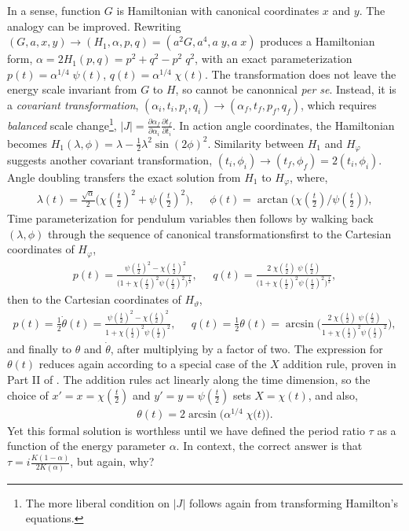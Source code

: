 \documentclass[nofootinbib,preprint]{revtex4-1}
\begin{document}
In a sense, function $G$ is Hamiltonian with canonical coordinates $x$ and $y$. The analogy can be 
improved. Rewriting $(G,a,x,y) \rightarrow (H_1,\alpha,p,q)=(a^2 G,a^4,a\;y,a\;x)$
produces a Hamiltonian form, $\alpha=2H_1(p,q)=p^2+q^2 - p^2 \; q^2$, with an exact parameterization 
${p(t)=\alpha^{1/4} \;\psi(t)}$, ${q(t)=\alpha^{1/4} \;\chi(t)}$. The transformation does not leave 
the energy scale invariant from $G$ to $H$, so cannot be canonnical \textit{per se}. Instead, it is a 
\textit{covariant transformation}, $(\alpha_i,t_i,p_i,q_i) \rightarrow (\alpha_f,t_f,p_f,q_f)$, 
which requires \textit{balanced} scale change\footnote{The more liberal 
condition on $|J|$ follows again from transforming Hamilton's equations. }, 
$|J| = \frac{\partial\alpha_f}{\partial \alpha_i}\frac{\partial t_f}{\partial t_i}$. In action angle 
coordinates, the Hamiltonian becomes $H_1(\lambda,\phi) = \lambda-\frac{1}{2}\lambda^2\sin(2\phi)^2$.
Similarity between $H_{1}$ and $H_{\varphi}$ suggests another covariant transformation, 
$(t_i,\phi_i)\rightarrow (t_f,\phi_f)=2(t_i,\phi_i)$.  Angle doubling transfers the exact 
solution from $H_{1}$ to $H_{\varphi}$, where, 
\begin{eqnarray}
\lambda(t) = \frac{\sqrt{\alpha}}{2}\Big(\chi(\tfrac{t}{2})^2 + \psi(\tfrac{t}{2})^2\Big), \;\;\;\;\; 
\phi(t)   =  \arctan\big(\chi(\tfrac{t}{2})/\psi(\tfrac{t}{2})\big),  \nonumber 
\end{eqnarray}
Time parameterization for pendulum variables then follows by walking back $(\lambda,\phi)$ through 
the sequence of canonical transformations\textemdash first to the Cartesian coordinates of $H_{\varphi}$,
\begin{eqnarray}
p(t)   =  \frac{ \; \psi(\tfrac{t}{2})^2-\chi(\tfrac{t}{2})^2 
}{\Big(1+\chi(\tfrac{t}{2})^2  \psi(\tfrac{t}{2})^2\Big)^{\frac{1}{2}}},  \;\;\;\;\; 
q(t)  = \frac{2 \;  \chi(\tfrac{t}{2})\;\psi(\tfrac{t}{2}) 
}{\Big(1+\chi(\tfrac{t}{2})^2 \psi(\tfrac{t}{2})^2\Big)^{\frac{1}{2}}}, \nonumber 
\end{eqnarray}
then to the Cartesian coordinates of $H_{\vartheta}$,
\begin{eqnarray}
p(t)   = \tfrac{1}{2} \dot{\theta}(t) = \frac{\psi(\tfrac{t}{2})^2 - \chi(\tfrac{t}{2})^2
}{1+\chi(\tfrac{t}{2})^2 \psi(\tfrac{t}{2})^2 }, \;\;\;\;\; 
q(t)   = \tfrac{1}{2} \theta(t) =  \arcsin\bigg(\frac{2\;\chi(\tfrac{t}{2})\; \psi(\tfrac{t}{2})
}{1+\chi(\tfrac{t}{2})^2 \psi(\tfrac{t}{2})^2 }\bigg), \nonumber 
\end{eqnarray}
and finally to $\theta$ and $\dot{\theta}$, after multiplying by a factor of two. The expression 
for $\theta(t)$ reduces again according to a special case of the $X$ 
addition rule, proven in Part II of \cite{EDWARDS2007}. The addition rules act linearly along 
the time dimension, so the choice of $x'=x=\chi(\tfrac{t}{2})$ and 
$y'=y=\psi(\tfrac{t}{2})$ sets $X=\chi(t)$, and also, 
\begin{eqnarray}
\theta(t) = 2 \arcsin\Big(\alpha^{1/4}\;\chi\big(t\big) \Big).  \nonumber
\end{eqnarray}
Yet this formal solution is worthless until we have defined the period ratio $\tau$ as a 
function of the energy parameter $\alpha$. In context, the correct answer is that 
$\tau = i \frac{K(1-\alpha)}{2K(\alpha)}$, but again, why?
\end{document}

